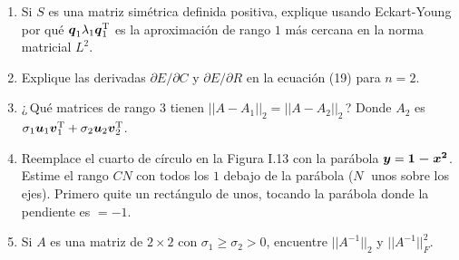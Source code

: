 \documentclass[12pt,a4paper]{article}
\newcommand{\lili}[1]{{\color{lili}#1}}
\newcommand{\bi}[1]{\hbox{\boldmath$#1$}}
\newcommand\1{\mbox{\,\vrule height-0.8pt depth1.0pt width2pc\,}}
\newcommand\2{\mbox{\,\vrule height-0.8pt depth1.0pt width1pc\,}}
\DeclareRobustCommand\transp{^{\mathrm{T}}}
\newcommand{\bu}{\hbox{\boldmath$u$}}
\newcommand{\bv}{\hbox{\boldmath$v$}}
\begin{document}
\begin{enumerate}
\quad\; Encuentre una matriz diagonal $A$ donde $||QA||_\infty\neq ||A||_\infty$ con $Q=\left[\begin{array}{@{\,}r@{\;\;}r@{\,}}\cos\theta&-\sin\theta\\\sin\theta&\cos\theta\end{array}\right]$.
\item Si $S$
es una matriz simétrica definida positiva, explique usando Eckart-Young por qué $\bi{q}_1\lambda_1\bi{q}_1\transp$ es la aproximación de rango $1$ más cercana en la norma matricial $L^2$. %
\item Explique las derivadas $\partial E/\partial C$ y $\partial E/\partial R$ en la ecuación (19) para $n=2$.
\item ¿\,Qué matrices de rango $3$ tienen $||A-A_1||_2=||A-A_2||_2$\,? Donde $A_2$ es $\sigma_1\bu_1\bv_1\transp+\sigma_2\bu_2\bv_2\transp$.\linebreak\vspace{-11pt}
\item Reemplace el cuarto de círculo en la Figura I.13 con la parábola $\bi{y}=\bi{1-x^2}$. Estime el rango $CN$ con todos los $1$ debajo de la parábola ($N\;$ unos sobre los ejes). Primero quite un rectángulo de unos, tocando la parábola donde la pendiente es $=-1$.
\item Si $A$ es una matriz de $2 \times 2$ con $\sigma_1\geq\sigma_2>0$, encuentre $||A^{-1}||_2$ y $||A^{-1}||^2_F$.
\end{enumerate}
\end{document}
